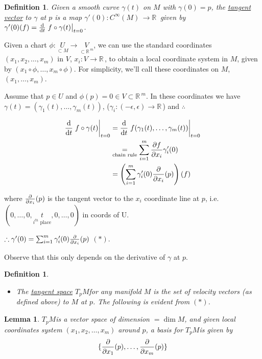 \documentclass[12pt,a4paper]{article}
\newcommand{\rR}{\ensuremath{\mathbb{R}\,}}
\newcommand{\cinfm}{\ensuremath{C^{\infty}(M)\,}}
\newcommand{\tpm}{\ensuremath{T_p M}}
\newcommand{\ul}[1]{\underline{#1}}
\newtheorem{defn}[thm]{Definition}
\newtheorem{lemma}[thm]{Lemma}
\begin{document}
\begin{defn}
Given a smooth curve $\gamma(t)$ on $M$ with $\gamma(0)=p$, the \ul{tangent vector} to $\gamma$ at $p$ is a map $\gamma'(0):\cinfm \to \rR$ given by $\gamma'(0)(f)=\dv{t}\eval{f\circ \gamma(t)}_{t=0}$.
\end{defn}

Given a chart $\phi:\underset{\subset M}{U}\to \underset{\subset \rR^m}{V}$, we can use the standard coordinates $(x_1,x_2,\ldots, x_m)$ in $V$, $x_i :V\to \rR$, to obtain a local coordinate system in $M$, given by $(x_1\circ \phi, \ldots, x_m\circ \phi)$. For simplicity, we'll call these coordinates on $M$, $(x_1,\ldots, x_m)$.

Assume that $p\in U$ and $\phi(p)=0\in V\subset \rR^m$. In these coordinates we have $\gamma(t)=(\gamma_1(t),\ldots,\gamma_m(t))$, ($\gamma_i :(-\epsilon,\epsilon)\to \rR$) and $\therefore$

\begin{align*}
\dv{t}\eval{f\circ \gamma(t)}_{t=0}&=\dv{t}\eval{f(\gamma_1(t),\ldots,\gamma_m(t))}_{t=0}\\
&\underset{\text{chain rule}}{=}\sum_{i=1}^{m} \pdv{f}{x_i}(p)\gamma_i'(0)\\
&=\left(\sum_{i=1}^{m} \gamma_i'(0)\pdv{x_i}(p)\right) (f)
\end{align*}

where $\pdv{x_i}(p)$ is the tangent vector to the $x_i$ coordinate line at $p$, i.e. $(0,\ldots,0,\underset{i^{th} \text{ place}}{t},0,\ldots,0)$ in coords of U.

$\therefore \gamma'(0) = \sum_{i=1}^{m} \gamma_i'(0)\pdv{x_i}(p)$ $(*)$.

Observe that this only depends on the derivative of $\gamma$ at $p$.

\addtocounter{thm}{-2}
\begin{defn}
\begin{itemize}
\item[(b)] The \ul{tangent space} \tpm for any manifold $M$ is the set of velocity vectors (as defined above) to $M$ at $p$. The following is evident from $(*)$.
\end{itemize}
\end{defn}

\addtocounter{thm}{1}

\begin{lemma}
\tpm is a vector space of dimension $=\dim M$, and given local coordinates system $(x_1,x_2,\ldots, x_m)$ around $p$, a basis for \tpm is given by 
\[\{\pdv{x_1}(p),\ldots, \pdv{x_m}(p) \}\]
\end{lemma}
\end{document}
